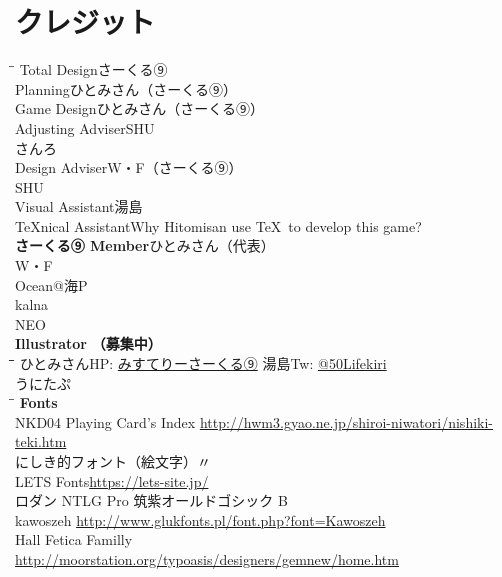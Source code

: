 \documentclass[line_length=22zw,number_of_lines=45,twocolumn]{jlreq}
\newcommand{\hmemph}[1]{\textbf{#1}}
\begin{document}
\onecolumn
\section{クレジット}
\begin{tabbing}
	\hspace{15\zw}\=\hspace{15\zw}\=\kill
	Total Design\>さーくる⑨\\
	Planning\>ひとみさん（さーくる⑨）\\
	Game Design\>ひとみさん（さーくる⑨）\\
	Adjusting Adviser\>SHU\\
	\>さんろ\\
	Design Adviser\>W・F（さーくる⑨）\\
	\>SHU\\
	Visual Assistant\>湯島\\
	\TeX nical Assistant\>Why Hitomisan use \TeX\ to develop this game?\\
	\hmemph{さーくる⑨ Member}\>ひとみさん（代表）\\
	\>W・F\\
	\>Ocean@海P\\
	\>kalna\\
	\>NEO\\
	\hmemph{Illustrator} \hmemph{（募集中）}\\
	\hspace{8\zw}\=\hspace{15\zw}\=\hspace{8\zw}\=\hspace{15\zw}\=\kill
	ひとみさん\>HP: \href{http://www.circle9.work}{みすてりーさーくる⑨}\>
	湯島\>Tw: \href{https://twitter.com/50lifekiri}{@50Lifekiri}\\
	うにたぷ\\
	\hspace{15\zw}\=\hspace{15\zw}\=\kill
	\hmemph{Fonts}\\
	{NKD04 Playing Card's Index}\>
		\url{http://hwm3.gyao.ne.jp/shiroi-niwatori/nishiki-teki.htm}\\
	{にしき的フォント（絵文字）}\>〃\\
	{LETS Fonts}\>\url{https://lets-site.jp/}\\
	\quad
		{ロダン NTLG Pro}\quad
		{筑紫オールドゴシック B}\\
	{kawoszeh}\>
		\url{http://www.glukfonts.pl/font.php?font=Kawoszeh}\\
	Hall Fetica Familly\>
		\url{http://moorstation.org/typoasis/designers/gemnew/home.htm}\\
\end{tabbing}

\doclicenseThis
\end{document}
